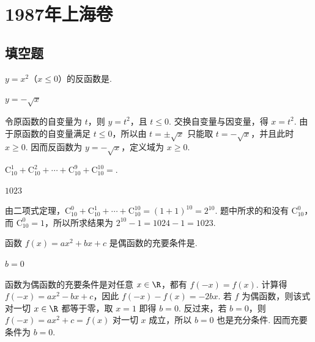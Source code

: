 \documentclass[UTF8,a4paper,oneside,11pt]{ctexbook}
\begin{document}
\mainmatter

\chapter{1987年上海卷}

\section{填空题}

\begin{problem}
\(y=x^2\)（\(x\leqslant 0\)）的反函数是\fillinblank{}.
\end{problem}

\begin{answer}
\(y=-\sqrt{x}\)
\end{answer}

\begin{solution}
令原函数的自变量为 \(t\)，则 \(y=t^2\)，且 \(t\leqslant0\). 交换自变量与因变量，得 \(x=t^2\). 由于原函数的自变量满足 \(t\leqslant0\)，所以由 \(t=\pm\sqrt{x}\) 只能取 \(t=-\sqrt{x}\)，并且此时 \(x\geqslant0\). 因而反函数为 \(y=-\sqrt{x}\)，定义域为 \(x\geqslant0\).
\end{solution}

\begin{problem}
\(\mathrm C_{10}^1+\mathrm C_{10}^2+\cdots+\mathrm C_{10}^9+\mathrm C_{10}^{10}=\)\fillinblank{}.
\end{problem}

\begin{answer}
\(1023\)
\end{answer}

\begin{solution}
由二项式定理，\(\mathrm C_{10}^0+\mathrm C_{10}^1+\cdots+\mathrm C_{10}^{10}=(1+1)^{10}=2^{10}\). 题中所求的和没有 \(\mathrm C_{10}^0\)，而 \(\mathrm C_{10}^0=1\)，所以所求结果为 \(2^{10}-1=1024-1=1023\).
\end{solution}

\begin{problem}
函数 \(f(x)=ax^2+bx+c\) 是偶函数的充要条件是\fillinblank{}.
\end{problem}

\begin{answer}
\(b=0\)
\end{answer}

\begin{solution}
函数为偶函数的充要条件是对任意 \(x\in\R\)，都有 \(f(-x)=f(x)\). 计算得 \(f(-x)=ax^2-bx+c\)，因此
\(f(-x)-f(x)=-2bx\). 若 \(f\) 为偶函数，则该式对一切 \(x\in\R\) 都等于零，取 \(x=1\) 即得 \(b=0\). 反过来，若 \(b=0\)，则 \(f(-x)=ax^2+c=f(x)\) 对一切 \(x\) 成立，所以 \(b=0\) 也是充分条件. 因而充要条件为 \(b=0\).
\end{solution}
\end{document}
